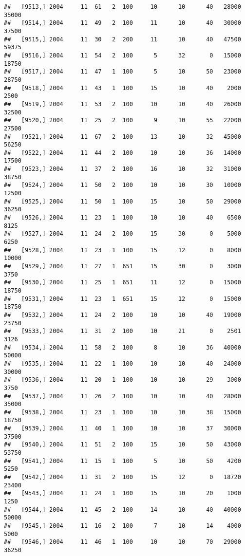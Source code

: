 \documentclass{article}\usepackage[]{graphicx}\usepackage[]{color}
\makeatletter
\newenvironment{kframe}{%
 \def\at@end@of@kframe{}%
 \ifinner\ifhmode%
  \def\at@end@of@kframe{\end{minipage}}%
  \begin{minipage}{\columnwidth}%
 \fi\fi%
 \def\FrameCommand##1{\hskip\@totalleftmargin \hskip-\fboxsep
 \colorbox{shadecolor}{##1}\hskip-\fboxsep
     \hskip-\linewidth \hskip-\@totalleftmargin \hskip\columnwidth}%
 \MakeFramed {\advance\hsize-\width
   \@totalleftmargin\z@ \linewidth\hsize
   \@setminipage}}%
 {\par\unskip\endMakeFramed%
 \at@end@of@kframe}
\newenvironment{knitrout}{}{} %
\makeatother
\begin{document}
\begin{knitrout}
\begin{kframe}
\begin{verbatim}
##   [9513,] 2004     11  61   2  100     10      10      40   28000   35000
##   [9514,] 2004     11  49   2  100     11      10      40   30000   37500
##   [9515,] 2004     11  30   2  200     11      10      40   47500   59375
##   [9516,] 2004     11  54   2  100      5      32       0   15000   18750
##   [9517,] 2004     11  47   1  100      5      10      50   23000   28750
##   [9518,] 2004     11  43   1  100     15      10      40    2000    2500
##   [9519,] 2004     11  53   2  100     10      10      40   26000   32500
##   [9520,] 2004     11  25   2  100      9      10      55   22000   27500
##   [9521,] 2004     11  67   2  100     13      10      32   45000   56250
##   [9522,] 2004     11  44   2  100     10      10      36   14000   17500
##   [9523,] 2004     11  37   2  100     16      10      32   31000   38750
##   [9524,] 2004     11  50   2  100     10      10      30   10000   12500
##   [9525,] 2004     11  50   1  100     15      10      50   29000   36250
##   [9526,] 2004     11  23   1  100     10      10      40    6500    8125
##   [9527,] 2004     11  24   2  100     15      30       0    5000    6250
##   [9528,] 2004     11  23   1  100     15      12       0    8000   10000
##   [9529,] 2004     11  27   1  651     15      30       0    3000    3750
##   [9530,] 2004     11  25   1  651     11      12       0   15000   18750
##   [9531,] 2004     11  23   1  651     15      12       0   15000   18750
##   [9532,] 2004     11  24   2  100     10      10      40   19000   23750
##   [9533,] 2004     11  31   2  100     10      21       0    2501    3126
##   [9534,] 2004     11  58   2  100      8      10      36   40000   50000
##   [9535,] 2004     11  22   1  100     10      10      40   24000   30000
##   [9536,] 2004     11  20   1  100     10      10      29    3000    3750
##   [9537,] 2004     11  26   2  100     10      10      40   28000   35000
##   [9538,] 2004     11  23   1  100     10      10      38   15000   18750
##   [9539,] 2004     11  40   1  100     10      10      37   30000   37500
##   [9540,] 2004     11  51   2  100     15      10      50   43000   53750
##   [9541,] 2004     11  15   1  100      5      10      50    4200    5250
##   [9542,] 2004     11  31   2  100     15      12       0   18720   23400
##   [9543,] 2004     11  24   1  100     15      10      20    1000    1250
##   [9544,] 2004     11  45   2  100     14      10      40   40000   50000
##   [9545,] 2004     11  16   2  100      7      10      14    4000    5000
##   [9546,] 2004     11  46   1  100     10      10      70   29000   36250

\end{verbatim}
\end{kframe}
\end{knitrout}
\end{document}
